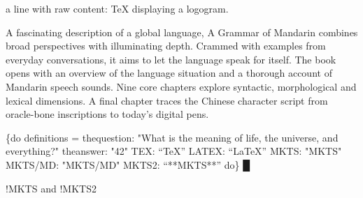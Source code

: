 
a line with raw content: \TeX{} displaying a logogram.\mktsShowpar\par
A fascinating description of a global language, {\mktsStyleItalic{}A Grammar of Mandarin\/} combines broad perspectives with illuminating depth. Crammed with examples from everyday conversations, it aims to let the language speak for itself. The book opens with an overview of the language situation and a thorough account of Mandarin speech sounds. Nine core chapters explore syntactic, morphological and lexical dimensions. A final chapter traces the Chinese character script from oracle-bone inscriptions to today’s digital pens.\mktsShowpar\par
{\mktsStyleBold\color{violet}{%
\mktsStyleSymbol█}\{do {\mktsStyleSymbol}}
definitions =
  thequestion:    "{\mktsStyleItalic{}What is the meaning of life, the universe, and everything?\/}"
  theanswer:      "{\mktsStyleBold{}42}"
  TEX:            “\TeX{}”
  LATEX:          “\LaTeX{}”
  MKTS:           "{\mktsStyleBold{}MKTS}"
  MKTS/MD:        "{\mktsStyleBold{}MKTS/MD}"
  MKTS2:          “**MKTS**”
{\mktsStyleBold\color{violet}{%
\mktsStyleSymbol}do\} {\mktsStyleSymbol█}}\mktsShowpar\par
{\mktsStyleBold\color{violet}{%
\mktsStyleSymbol█}!MKTS {\mktsStyleSymbol}} and {\mktsStyleBold\color{violet}{%
\mktsStyleSymbol█}!MKTS2 {\mktsStyleSymbol}}

